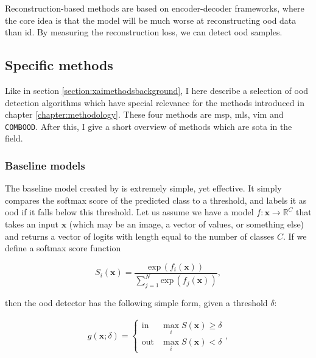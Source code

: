 \documentclass[UKenglish]{uiomasterthesis} %
\newcommand{\R}{\mathbb{R}}
\theoremstyle{definition}
\begin{document}
Reconstruction-based methods are based on encoder-decoder frameworks, where the core idea is that the model will be much worse at reconstructing \ac{ood} data than \ac{id}. By measuring the reconstruction loss, we can detect \ac{ood} samples.
\\

\subsection{Specific methods} \label{ood_specific}

Like in section \ref{section:xaimethodsbackground}, I here describe a selection of \ac{ood} detection algorithms which have special relevance for the methods introduced in chapter \ref{chapter:methodology}. These four methods are \acf{msp}, \acf{mls}, \acf{vim} and \texttt{COMBOOD}. After this, I give a short overview of methods which are \ac{sota} in the field.

\subsubsection{Baseline models} \label{section:background_baselines}

The baseline model created by \cite{oodbaseline} is extremely simple, yet effective. It simply compares the softmax score of the predicted class to a threshold, and labels it as \ac{ood} if it falls below this threshold. Let us assume we have a model $f: \bm{x} \rightarrow \R^C$ that takes an input $\bm{x}$ (which may be an image, a vector of values, or something else) and returns a vector of logits with length equal to the number of classes $C$. If we define a softmax score function 

\begin{equation}
    S_i(\bm{x}) = \frac{\text{exp} \, (f_i(\bm{x}))}{\sum^N_{j=1} \text{exp} \, (f_j(\bm{x}))},
\label{softmax}
\end{equation}

\noindent then the \ac{ood} detector has the following simple form, given a threshold $\delta$:

\begin{align}
\label{eq:msp}
    g(\bm{x}; \delta)=\begin{cases} 
        \text{in } & \max_i S(\bm{x})\ge \delta \\
        \text{out} & \max_i S(\bm{x}) < \delta 
   \end{cases},
\end{align}
\end{document}
